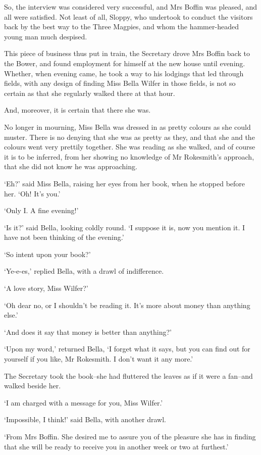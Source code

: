 So, the interview was considered very successful, and Mrs Boffin was
pleased, and all were satisfied. Not least of all, Sloppy, who undertook
to conduct the visitors back by the best way to the Three Magpies, and
whom the hammer-headed young man much despised.

This piece of business thus put in train, the Secretary drove Mrs Boffin
back to the Bower, and found employment for himself at the new house
until evening. Whether, when evening came, he took a way to his lodgings
that led through fields, with any design of finding Miss Bella Wilfer
in those fields, is not so certain as that she regularly walked there at
that hour.

And, moreover, it is certain that there she was.

No longer in mourning, Miss Bella was dressed in as pretty colours as
she could muster. There is no denying that she was as pretty as they,
and that she and the colours went very prettily together. She was
reading as she walked, and of course it is to be inferred, from her
showing no knowledge of Mr Rokesmith’s approach, that she did not know
he was approaching.

‘Eh?’ said Miss Bella, raising her eyes from her book, when he stopped
before her. ‘Oh! It’s you.’

‘Only I. A fine evening!’

‘Is it?’ said Bella, looking coldly round. ‘I suppose it is, now you
mention it. I have not been thinking of the evening.’

‘So intent upon your book?’

‘Ye-e-es,’ replied Bella, with a drawl of indifference.

‘A love story, Miss Wilfer?’

‘Oh dear no, or I shouldn’t be reading it. It’s more about money than
anything else.’

‘And does it say that money is better than anything?’

‘Upon my word,’ returned Bella, ‘I forget what it says, but you can find
out for yourself if you like, Mr Rokesmith. I don’t want it any more.’

The Secretary took the book--she had fluttered the leaves as if it were
a fan--and walked beside her.

‘I am charged with a message for you, Miss Wilfer.’

‘Impossible, I think!’ said Bella, with another drawl.

‘From Mrs Boffin. She desired me to assure you of the pleasure she has
in finding that she will be ready to receive you in another week or two
at furthest.’

